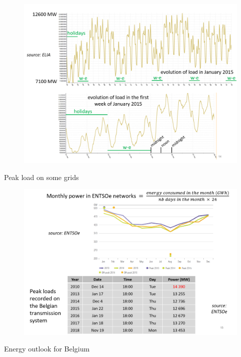 \begin{frame}
\begin{figure}
\centering
\includegraphics[width=\linewidth]{images/consumption_be_zoom.png}
\end{figure}
\end{frame}

\begin{frame}
{Peak load on some grids}
\begin{figure}
\centering
\includegraphics[width=\linewidth]{images/peaks_BE.png}
\end{figure}
\end{frame}

\begin{frame}
{Energy outlook for Belgium}
\end{frame}

